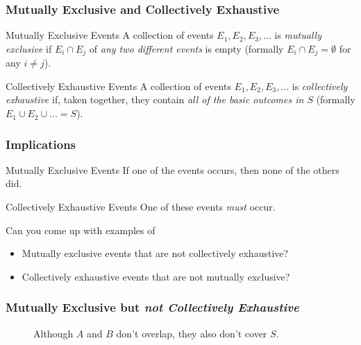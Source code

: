 \documentclass{beamer}
\begin{document}
\begin{frame}
\frametitle{Mutually Exclusive and Collectively Exhaustive}
	\begin{block}{Mutually Exclusive Events}
		A collection of events $E_1, E_2, E_3, \hdots$ is \emph{\alert{mutually exclusive}} if $E_i \cap 
		E_j$ of \alert{\emph{any two different events}} is empty (formally $E_i \cap E_j = \emptyset$ 
		for any $i\neq j$).
	\end{block}
	
	\begin{block}{Collectively Exhaustive Events}
		A collection of events $E_1, E_2, E_3, \hdots$ is \emph{\alert{collectively exhaustive}} if, taken 
		together, they contain \alert{\emph{all of the basic outcomes in $S$}} (formally $E_1 \cup E_2 
		\cup \ldots  = S$).
	\end{block}
\end{frame}
\begin{frame}
\frametitle{Implications}
	\begin{block}{Mutually Exclusive Events}
	      If one of the events occurs, then none of the others did.
	\end{block}
	
	\begin{block}{Collectively Exhaustive Events}
        One of these events \emph{must} occur.
	\end{block}
	
	Can you come up with examples of 
	\begin{itemize}
	    \item Mutually exclusive events that are not collectively exhaustive?
	    \item Collectively exhaustive events that are not mutually exclusive?
	\end{itemize}
\end{frame}

\def\Srect{(-2,-2) rectangle (4,2)}
\def\Arect{(-2,-2) rectangle (0,2)}
\def\Brect{(0,-2) rectangle (2,2)}
\def\Crect{(0,2) rectangle (4,2)}
\def\Devent{(1.6,-0.3) circle (1.3)}
\def\Eevent{(-1,1.2) circle (0.5)}
\begin{frame}
\frametitle{Mutually Exclusive but \emph{not Collectively Exhaustive}}
\begin{figure}
\centering
{}
\caption{Although $A$ and $B$ don't overlap, they also don't cover $S$.}
\end{figure}
\end{frame}
\end{document}
